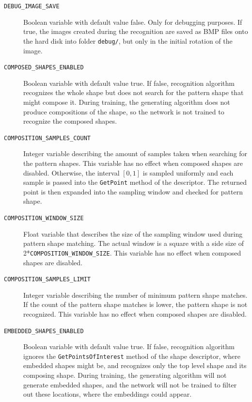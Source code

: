 \begin{description}
\item[\texttt{DEBUG\_IMAGE\_SAVE}] Boolean variable with default value false. Only for debugging purposes. If true, the images created during the recognition are saved as BMP files onto the hard disk into folder \texttt{debug/}, but only in the initial rotation of the image.

\item[\texttt{COMPOSED\_SHAPES\_ENABLED}] Boolean variable with default value true. If false, recognition algorithm recognizes the whole shape but does not search for the pattern shape that might compose it. During training, the generating algorithm does not produce compositions of the shape, so the network is not trained to recognize the composed shapes.

\item[\texttt{COMPOSITION\_SAMPLES\_COUNT}] Integer variable describing the amount of samples taken when searching for the pattern shapes. This variable has no effect when composed shapes are disabled. Otherwise, the interval $[0,1]$ is sampled uniformly and each sample is passed into the \texttt{GetPoint} method of the descriptor. The returned point is then expanded into the sampling window and checked for pattern shape.

\item[\texttt{COMPOSITION\_WINDOW\_SIZE}] Float variable that describes the size of the sampling window used during pattern shape matching. The actual window is a square with a side size of 2*\texttt{COMPOSITION\_WINDOW\_SIZE}. This variable has no effect when composed shapes are disabled.

\item[\texttt{COMPOSITION\_SAMPLES\_LIMIT}] Integer variable describing the number of minimum pattern shape matches. If the count of the pattern shape matches is lower, the pattern shape is not recognized. This variable has no effect when composed shapes are disabled.

\item[\texttt{EMBEDDED\_SHAPES\_ENABLED}] Boolean variable with default value true. If false, recognition algorithm ignores the \texttt{GetPointsOfInterest} method of the shape descriptor, where embedded shapes might be, and recognizes only the top level shape and its composing shape. During training, the generating algorithm will not generate embedded shapes, and the network will not be trained to filter out these locations, where the embeddings could appear.


\end{description}
